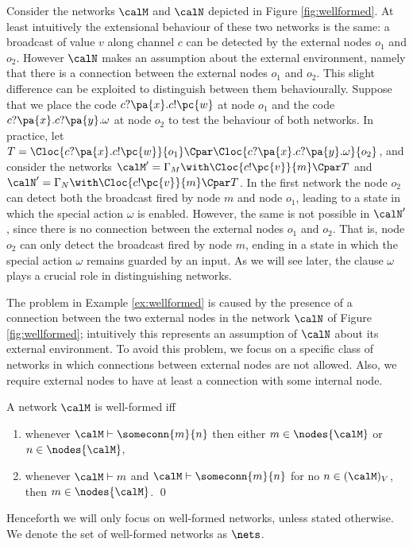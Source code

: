 \documentclass{LMCS}
\begin{document}
\begin{exa}
\label{ex:wellformed}
Consider the networks $\calM$ and $\calN$ depicted in 
Figure \ref{fig:wellformed}. At least intuitively the extensional 
behaviour of these two networks is the same: a broadcast of 
value $v$ along channel $c$ can be detected by the external nodes 
$o_1$ and $o_2$. However $\calN$ makes an assumption about the
external environment, namely that there is a connection between
the external nodes $o_1$ and $o_2$. This slight difference 
can be  exploited to distinguish between them behaviourally.
 Suppose that we place the code $c?\pa{x}.c!\pc{w}$ at 
node $o_1$ and the code $c?\pa{x}.c?\pa{y}.\omega$ at 
node $o_2$ to test the behaviour of both networks. 
In practice, let $T = \Cloc{c?\pa{x}.c!\pc{w}}{o_1} \Cpar 
\Cloc{c?\pa{x}.c?\pa{y}.\omega}{o_2}$, and consider the 
networks $\calM' = \Gamma_M \with \Cloc{c!\pc{v}}{m} \Cpar T$ and 
$\calN' = \Gamma_N \with \Cloc{c!\pc{v}}{m} \Cpar T$. 
In the first network the node $o_2$ can detect both the 
broadcast fired by node $m$ and node $o_1$, leading to 
a state in which the special action $\omega$ is enabled. 
However, the same is not possible in $\calN'$, since there 
is no connection between the external nodes $o_1$ and $o_2$. 
That is, node $o_2$ can only detect the broadcast fired by 
node $m$, ending in a state in which the special action 
$\omega$ remains guarded by an input. As we will see later, 
the clause $\omega$ plays a crucial role in distinguishing 
networks.
\end{exa}

The problem in  Example \ref{ex:wellformed} is caused 
by the presence of a connection between the two 
external nodes in the network $\calN$ 
of Figure \ref{fig:wellformed};
intuitively this represents an assumption of 
$\calN$ about its external environment. To avoid this 
problem, we focus on a specific 
class of networks in which connections between 
external nodes are not allowed. Also, we 
require external nodes to have at least a connection 
with some internal node.

\begin{defi}
\label{def:well.formed}
A network $\calM$ is well-formed iff 
\begin{enumerate}[label=(\roman*)]
\item whenever $\calM \vdash \someconn{m}{n}$ then 
either $m \in \nodes{\calM}$ or $n \in \nodes{\calM}$,
\item whenever $\calM \vdash m$ and $\calM \vdash \someconn{m}{n}$ 
for no $n \in (\calM)_V$, then $m \in \nodes{\calM}$. 
\qed
\end{enumerate}
\end{defi}
\noindent 
Henceforth we will only focus on well-formed networks, unless stated otherwise. 
We denote the set of well-formed networks as $\nets$.
\end{document}

